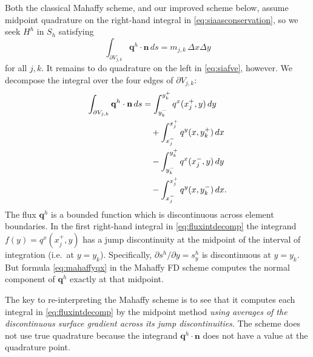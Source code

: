 \documentclass[twocolumn,a4paper]{igs}
\newcommand\bn{\mathbf{n}}
\newcommand\bq{\mathbf{q}}
\begin{document}
Both the classical Mahaffy scheme, and our improved scheme below, assume midpoint quadrature on the right-hand integral in \eqref{eq:siaasconservation}, so we seek $H^h$ in $S_h$ satisfying
\begin{equation}
  \int_{\partial V_{j,k}} \bq^h \cdot \bn\,ds = m_{j,k}\, \Delta x \Delta y \label{eq:siafve}
\end{equation}
for all $j,k$.  It remains to do quadrature on the left in \eqref{eq:siafve}, however.  We decompose the integral over the four edges of $\partial V_{j,k}$:
\begin{align}
\int_{\partial V_{j,k}} \bq^h \cdot \bn\,ds &= \int_{y_k^-}^{y_k^+} q^x(x_j^+,y)\,dy \label{eq:fluxintdecomp} \\
&\quad + \int_{x_j^-}^{x_j^+} q^y(x,y_k^+)\,dx \notag \\
&\quad - \int_{y_k^-}^{y_k^+} q^x(x_j^-,y)\,dy \notag \\
&\quad - \int_{x_j^-}^{x_j^+} q^y(x,y_k^-)\,dx. \notag
\end{align}
The flux $\bq^h$ is a bounded function which is discontinuous across element boundaries.  In the first right-hand integral in \eqref{eq:fluxintdecomp} the integrand $f(y) = q^x(x_j^+,y)$ has a jump discontinuity at the midpoint of the interval of integration (i.e.~at $y=y_k$).  Specifically, $\partial s^h/\partial y = s^h_y$ is discontinuous at $y=y_k$.  But formula \eqref{eq:mahaffyqx} in the Mahaffy FD scheme computes the normal component of $\bq^h$ exactly at that midpoint.

The key to re-interpreting the Mahaffy scheme is to see that it computes each integral in \eqref{eq:fluxintdecomp} by the midpoint method \emph{using averages of the discontinuous surface gradient across its jump discontinuities}.  The scheme does not use true quadrature because the integrand $\bq^h\cdot \bn$ does not have a value at the quadrature point.
\end{document}
